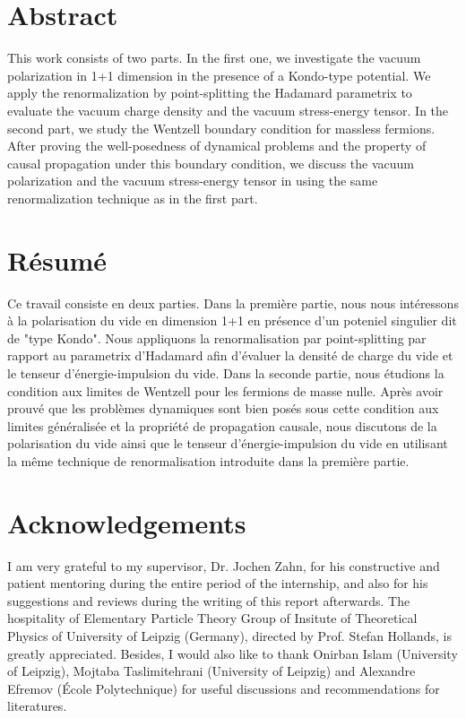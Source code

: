 \section*{Abstract}
This work consists of two parts.
In the first one, we investigate the vacuum polarization in 1+1 dimension in the presence of a Kondo-type potential.
We apply the renormalization by point-splitting \wrt the  Hadamard parametrix to evaluate the vacuum charge density and the vacuum stress-energy tensor.
In the second part, we study the Wentzell boundary condition for massless fermions.
After proving the well-posedness of dynamical problems and the property of causal propagation under this boundary condition, we discuss the vacuum polarization and the vacuum stress-energy tensor in using the same renormalization technique as in the first part.

\section*{Résumé}
Ce travail consiste en deux parties. 
Dans la première partie, nous nous intéressons à la polarisation du vide en dimension 1+1 en présence d'un poteniel singulier dit de "type Kondo".
Nous appliquons la renormalisation par point-splitting par rapport au parametrix d'Hadamard afin d'évaluer la densité de charge du vide et le tenseur d'énergie-impulsion du vide.
Dans la seconde partie, nous étudions la condition aux limites de Wentzell pour les fermions de masse nulle.
Après avoir prouvé que les problèmes dynamiques sont bien posés sous cette condition aux limites généralisée et la propriété de propagation causale,
nous discutons de la polarisation du vide ainsi que le tenseur d'énergie-impulsion du vide en utilisant la même technique de renormalisation introduite dans la première partie.

\newpage
\section*{Acknowledgements}
I am very grateful to my supervisor, Dr. Jochen Zahn, for his constructive and patient mentoring during the entire period of the internship, and also for his suggestions and reviews during the writing of this report afterwards.
The hospitality of Elementary Particle Theory Group of Insitute of Theoretical Physics of University of Leipzig (Germany), directed by Prof. Stefan Hollands, is greatly appreciated.
Besides, I would also like to thank Onirban Islam (University of Leipzig), Mojtaba Taslimitehrani (University of Leipzig) and Alexandre Efremov (École Polytechnique) for useful discussions and recommendations for literatures. 
\fi
